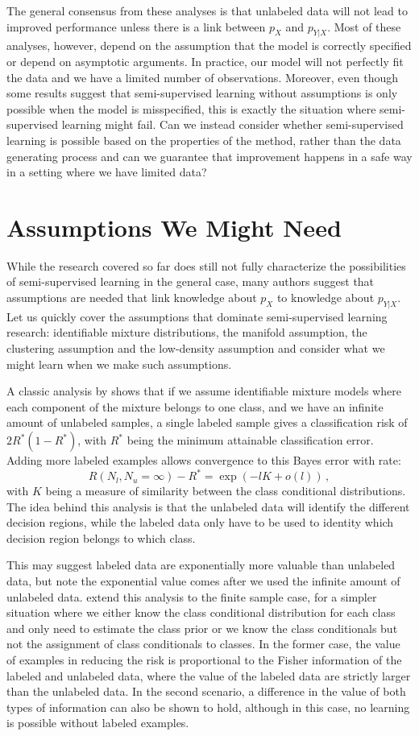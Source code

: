 \documentclass[twoside]{memoir}\usepackage[]{graphicx}\usepackage{xcolor}
\begin{document}
The general consensus from these analyses is that unlabeled data will not lead to improved performance unless there is a link between $p_X$ and $p_{Y|X}$. Most of these analyses, however, depend on the assumption that the model is correctly specified or depend on asymptotic arguments. In practice, our model will not perfectly fit the data and we have a limited number of observations. Moreover, even though some results suggest that semi-supervised learning without assumptions is only possible when the model is misspecified, this is exactly the situation where semi-supervised learning might fail. Can we instead consider whether semi-supervised learning is possible based on the properties of the method, rather than the data generating process and can we guarantee that improvement happens in a safe way in a setting where we have limited data?

\section{Assumptions We Might Need}
While the research covered so far does still not fully characterize the possibilities of semi-supervised learning in the general case, many authors suggest that assumptions are needed that link knowledge about $p_X$ to knowledge about $p_{Y|X}$. Let us quickly cover the assumptions that dominate semi-supervised learning research: identifiable mixture distributions, the manifold assumption, the clustering assumption and the low-density assumption and consider what we might learn when we make such assumptions.

A classic analysis by \citet{Castelli1995} shows that if we assume identifiable mixture models where each component of the mixture belongs to one class, and  we have an infinite amount of unlabeled samples, a single labeled sample gives a classification risk of $2R^*(1-R^*)$, with $R^*$ being the minimum attainable classification error. Adding more labeled examples allows convergence to this Bayes error with rate: 
$$
R(N_l,N_u=\infty) - R^* = \exp(-l K + o(l)) \,,
$$
with $K$ being a measure of similarity between the class conditional distributions. The idea behind this analysis is that the unlabeled data will identify the different decision regions, while the labeled data only have to be used to identity which decision region belongs to which class.

This may suggest labeled data are exponentially more valuable than unlabeled data, but note the exponential value comes after we used the infinite amount of unlabeled data. \citet{Castelli1996} extend this analysis to the finite sample case, for a simpler situation where we either know the class conditional distribution for each class and only need to estimate the class prior or we know the class conditionals but not the assignment of class conditionals to classes. In the former case, the value of examples in reducing the risk is proportional to the Fisher information of the labeled and unlabeled data, where the value of the labeled data are strictly larger than the unlabeled data. In the second scenario, a difference in the value of both types of information can also be shown to hold, although in this case, no learning is possible without labeled examples.
\end{document}
